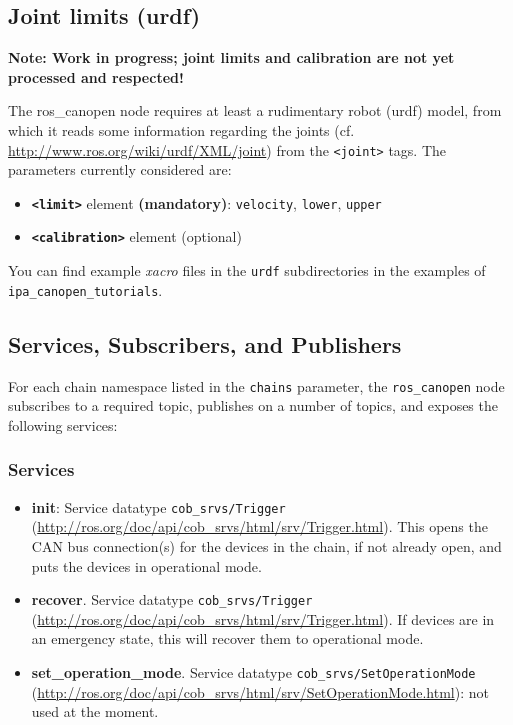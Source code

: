 \subsection{Joint limits (urdf)}

{\bf Note: Work in progress; joint limits and calibration are not yet processed and respected!}

The ros\_canopen node requires at least a rudimentary robot (urdf) model, from which it reads some information regarding the joints (cf. \url{http://www.ros.org/wiki/urdf/XML/joint}) from the \texttt{<joint>} tags. The parameters currently considered are:
\begin{itemize}
\item {\bf \texttt{<limit>}} element {\bf (mandatory)}: \texttt{velocity}, \texttt{lower}, \texttt{upper}
\item {\bf \texttt{<calibration>}} element (optional)
\end{itemize}

You can find example {\em xacro} files in the \texttt{urdf} subdirectories in the examples of \texttt{ipa\_canopen\_tutorials}.

\subsection{Services, Subscribers, and Publishers}

For each chain namespace listed in the \texttt{chains} parameter, the \texttt{ros\_canopen} node subscribes to a required topic, publishes on a number of topics, and exposes the following services:

\subsubsection{Services}

\begin{itemize}
\item {\bf init}: Service datatype \texttt{cob\_srvs/Trigger} (\url{http://ros.org/doc/api/cob_srvs/html/srv/Trigger.html}). This opens the CAN bus connection(s) for the devices in the chain, if not already open, and puts the devices in operational mode.
\item {\bf recover}. Service datatype \texttt{cob\_srvs/Trigger} (\url{http://ros.org/doc/api/cob_srvs/html/srv/Trigger.html}). If devices are in an emergency state, this will recover them to operational mode.
\item {\bf set\_operation\_mode}. Service datatype \texttt{cob\_srvs/SetOperationMode} (\url{http://ros.org/doc/api/cob_srvs/html/srv/SetOperationMode.html}): not used at the moment.
\end{itemize}

